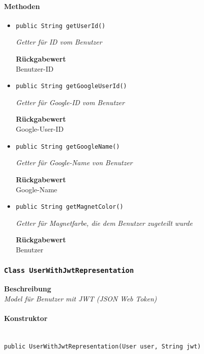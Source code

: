      \paragraph*{Methoden}
     \begin{itemize}
     	\item{\texttt{public String getUserId()}}
     	
     	\textit{Getter für ID vom Benutzer}
     	
     	
     	
     	\textbf{Rückgabewert} \\
     	Benutzer-ID        \item{\texttt{public String getGoogleUserId()}}
     	
     	\textit{Getter für Google-ID vom Benutzer}
     	
     	
     	
     	\textbf{Rückgabewert} \\
     	Google-User-ID        \item{\texttt{public String getGoogleName()}}
     	
     	\textit{Getter für Google-Name von Benutzer}
     	
     	
     	
     	\textbf{Rückgabewert} \\
     	Google-Name        \item{\texttt{public String getMagnetColor()}}
     	
     	\textit{Getter für Magnetfarbe, die dem Benutzer zugeteilt wurde}
     	
     	
     	
     	\textbf{Rückgabewert} \\
     	Benutzer
     \end{itemize}
     \subsubsection{\texttt{Class UserWithJwtRepresentation}}
     \textbf{Beschreibung} \\
     \textit{Model für Benutzer mit JWT (JSON Web Token)}
     \paragraph*{Konstruktor}\mbox{} \\
     \texttt{public UserWithJwtRepresentation(User user, String jwt)} \\
